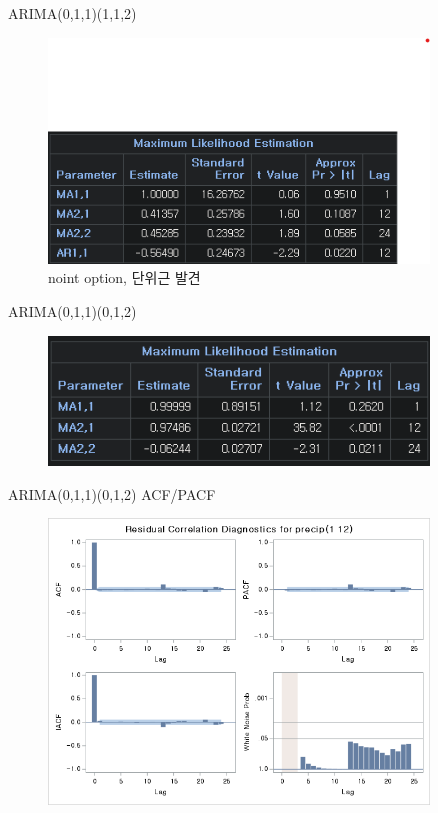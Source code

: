 \documentclass{beamer}
\begin{document}
\begin{frame}{ARIMA(0,1,1)(1,1,2)}
    \begin{figure}
        \centering
        \includegraphics[width=0.9\textwidth]{model1.png}
        \caption{noint option, 단위근 발견}
    \end{figure}
\end{frame}

\begin{frame}{ARIMA(0,1,1)(0,1,2)}
    \begin{figure}
        \centering
        \includegraphics[width=0.9\textwidth]{model2.png}
    \end{figure}
\end{frame}

\begin{frame}{ARIMA(0,1,1)(0,1,2) ACF/PACF}
    \begin{figure}
        \centering
        \includegraphics[width=0.9\textwidth]{model2_acf.png}
    \end{figure}
\end{frame}
\end{document}
